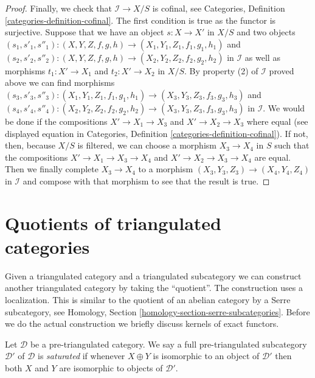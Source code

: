 \begin{proof}
\medskip\noindent
Finally, we check that $\mathcal{I} \to X/S$ is cofinal, see
Categories, Definition \ref{categories-definition-cofinal}.
The first condition is true as the functor is surjective.
Suppose that we have an object $s : X \to X'$ in $X/S$ and
two objects
$(s_1, s'_1, s''_1) : (X, Y, Z, f, g, h) \to (X_1, Y_1, Z_1, f_1, g_1, h_1)$
and
$(s_2, s'_2, s''_2) : (X, Y, Z, f, g, h) \to (X_2, Y_2, Z_2, f_2, g_2, h_2)$
in $\mathcal{I}$ as well as morphisms $t_1 : X' \to X_1$ and
$t_2 : X' \to X_2$ in $X/S$. By property (2) of $\mathcal{I}$
proved above we can find morphisms
$(s_3, s'_3, s''_3) : (X_1, Y_1, Z_1, f_1, g_1, h_1) \to
(X_3, Y_3, Z_3, f_3, g_3, h_3)$
and
$(s_4, s'_4, s''_4) : (X_2, Y_2, Z_2, f_2, g_2, h_2) \to
(X_3, Y_3, Z_3, f_3, g_3, h_3)$ in $\mathcal{I}$.
We would be done if the compositions
$X' \to X_1 \to X_3$ and $X' \to X_2 \to X_3$ where equal
(see displayed equation in 
Categories, Definition \ref{categories-definition-cofinal}).
If not, then, because $X/S$ is filtered, we can choose
a morphism $X_3 \to X_4$ in $S$ such that the compositions
$X' \to X_1 \to X_3 \to X_4$ and $X' \to X_2 \to X_3 \to X_4$ are equal.
Then we finally complete $X_3 \to X_4$ to a morphism
$(X_3, Y_3, Z_3) \to (X_4, Y_4, Z_4)$ in $\mathcal{I}$
and compose with that morphism to see that the result is true.
\end{proof}









\section{Quotients of triangulated categories}
\label{section-quotients}

\noindent
Given a triangulated category and a triangulated subcategory we can
construct another triangulated category by taking the ``quotient''.
The construction uses a localization. This is similar to the quotient
of an abelian category by a Serre subcategory, see
Homology, Section \ref{homology-section-serre-subcategories}.
Before we do the actual construction we briefly discuss kernels
of exact functors.

\begin{definition}
\label{definition-saturated}
Let $\mathcal{D}$ be a pre-triangulated category. We say a full
pre-triangulated subcategory $\mathcal{D}'$ of $\mathcal{D}$ is
{\it saturated} if whenever $X \oplus Y$ is isomorphic to an object
of $\mathcal{D}'$ then both $X$ and $Y$ are isomorphic to objects
of $\mathcal{D}'$.
\end{definition}

